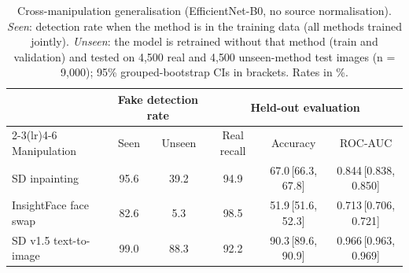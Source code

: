 \begin{table}[!t]
\centering
\caption{Cross-manipulation generalisation (EfficientNet-B0, no source normalisation). \emph{Seen}: detection rate when the method is in the training data (all methods trained jointly). \emph{Unseen}: the model is retrained without that method (train and validation) and tested on 4{,}500 real and 4{,}500 unseen-method test images (n = 9,000); 95\% grouped-bootstrap CIs in brackets. Rates in \%.}
\label{tab:cross_manip}
\setlength{\tabcolsep}{4pt}
\begin{tabular}{lccccc}
\toprule
 & \multicolumn{2}{c}{Fake detection rate} & \multicolumn{3}{c}{Held-out evaluation} \\
\cmidrule(lr){2-3}\cmidrule(lr){4-6}
Manipulation & Seen & Unseen & Real recall & Accuracy & ROC-AUC \\
\midrule
SD inpainting & 95.6 & 39.2 & 94.9 & 67.0\,{\scriptsize[66.3, 67.8]} & 0.844\,{\scriptsize[0.838, 0.850]} \\
InsightFace face swap & 82.6 & 5.3 & 98.5 & 51.9\,{\scriptsize[51.6, 52.3]} & 0.713\,{\scriptsize[0.706, 0.721]} \\
SD v1.5 text-to-image & 99.0 & 88.3 & 92.2 & 90.3\,{\scriptsize[89.6, 90.9]} & 0.966\,{\scriptsize[0.963, 0.969]} \\
\bottomrule
\end{tabular}
\end{table}
